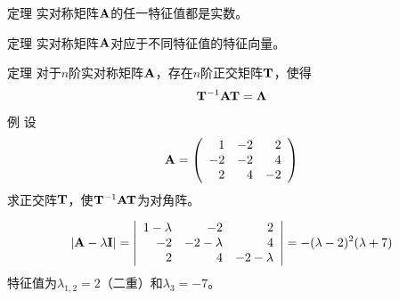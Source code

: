 \begin{frame}
  \begin{footnotesize}
    \begin{block}{定理}
      实对称矩阵$\mathbf{A}$的任一特征值都是实数。
    \end{block}
   
%
%
    \begin{block}{定理}
      实对称矩阵$\mathbf{A}$对应于不同特征值的特征向量。
    \end{block}
    
  \end{footnotesize}
\end{frame}



\begin{frame}
  \begin{footnotesize}
    \begin{block}{定理}
      对于$n$阶实对称矩阵$\mathbf{A}$，存在$n$阶正交矩阵$\mathbf{T}$，使得
      $$
      \mathbf{T}^{-1}\mathbf{A}\mathbf{T}=\mathbf{\Lambda}
      $$
    \end{block}
    
  \end{footnotesize}
\end{frame}



\begin{frame}
  \begin{footnotesize}
    \begin{exampleblock}{例}
      设
      $$
      \mathbf{A}=\left(
      \begin{array}{rrr}
        1&-2&2\\
        -2&-2&4\\
        2&4&-2
      \end{array}
      \right)
      $$
      求正交阵$\mathbf{T}$，使$\mathbf{T}^{-1}\mathbf{A}\mathbf{T}$为对角阵。      
    \end{exampleblock}
    \pause\jiename
    $$
    |\mathbf{A}-\lambda\mathbf{I}|=\left|
    \begin{array}{rrr}
      1-\lambda&-2&2\\
        -2&-2-\lambda&4\\
        2&4&-2-\lambda
    \end{array}
    \right| = -(\lambda-2)^2(\lambda+7)
    $$
    特征值为$\lambda_{1,2}=2$（二重）和$\lambda_3=-7$。
   \end{footnotesize}
\end{frame}



